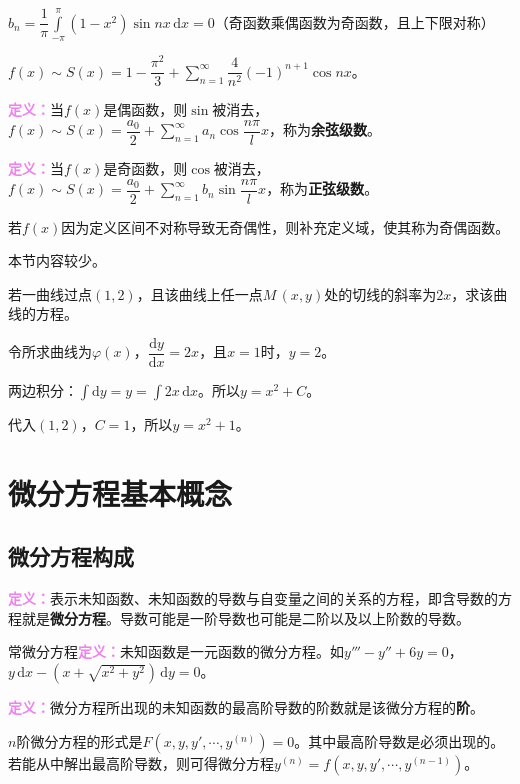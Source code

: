 \documentclass[UTF8, 12pt]{ctexart}
\begin{document}
        $b_n=\dfrac{1}{\pi}\int\limits_{-\pi}^\pi(1-x^2)\sin nx\,\textrm{d}x=0$（奇函数乘偶函数为奇函数，且上下限对称）

        $f(x)\sim S(x)=1-\dfrac{\pi^2}{3}+\sum\limits_{n=1}^\infty\dfrac{4}{n^2}(-1)^{n+1}\cos nx$。

        \textcolor{violet}{\textbf{定义：}}当$f(x)$是偶函数，则$\sin$被消去，$f(x)\sim S(x)=\dfrac{a_0}{2}+\sum\limits_{n=1}^\infty a_n\cos\dfrac{n\pi}{l}x$，称为\textbf{余弦级数}。

        \textcolor{violet}{\textbf{定义：}}当$f(x)$是奇函数，则$\cos$被消去，$f(x)\sim S(x)=\dfrac{a_0}{2}+\sum\limits_{n=1}^\infty b_n\sin\dfrac{n\pi}{l}x$，称为\textbf{正弦级数}。

        若$f(x)$因为定义区间不对称导致无奇偶性，则补充定义域，使其称为奇偶函数。


        本节内容较少。

        若一曲线过点$(1,2)$，且该曲线上任一点$M\,(x,y)$处的切线的斜率为$2x$，求该曲线的方程。

        令所求曲线为$\varphi(x)$，$\dfrac{\textrm{d}y}{\textrm{d}x}=2x$，且$x=1$时，$y=2$。

        两边积分：$\int\textrm{d}y=y=\int2x\,\textrm{d}x$。所以$y=x^2+C$。

        代入$(1,2)$，$C=1$，所以$y=x^2+1$。

        \section{微分方程基本概念}

        \subsection{微分方程构成}

        \textcolor{violet}{\textbf{定义：}}表示未知函数、未知函数的导数与自变量之间的关系的方程，即含导数的方程就是\textbf{微分方程}。导数可能是一阶导数也可能是二阶以及以上阶数的导数。

        常微分方程\textcolor{violet}{\textbf{定义：}}未知函数是一元函数的微分方程。如$y'''-y''+6y=0$，$y\,\textrm{d}x-(x+\sqrt{x^2+y^2})\,\textrm{d}y=0$。

        \textcolor{violet}{\textbf{定义：}}微分方程所出现的未知函数的最高阶导数的阶数就是该微分方程的\textbf{阶}。

        $n$阶微分方程的形式是$F(x,y,y',\cdots,y^{(n)})=0$。其中最高阶导数是必须出现的。若能从中解出最高阶导数，则可得微分方程$y^{(n)}=f(x,y,y',\cdots,y^{(n-1)})$。
\end{document}
